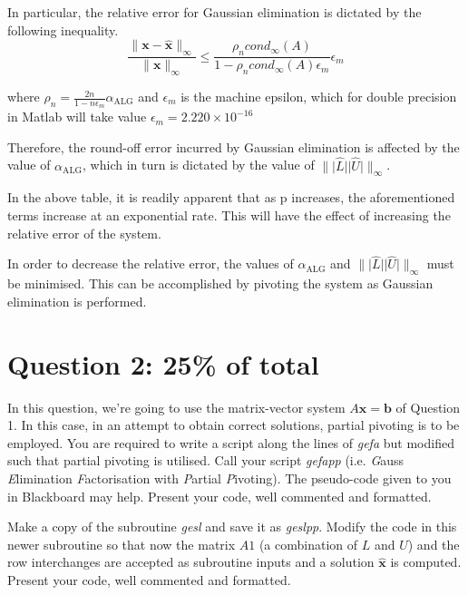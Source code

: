 \documentclass[12pt]{article}
\def\MM#1{\boldsymbol{#1}}
\begin{document}
In particular, the relative error for Gaussian elimination is dictated by the following inequality.
\begin{equation}
\label{eq:relative}
	\frac{\|{\MM{x}-\hat{\MM{x}}}\|_\infty}{\|{\MM{x}}\|_\infty} \leq \frac{\rho_n cond_{\infty}(A) }{1-\rho_n cond_{\infty}(A) \epsilon_m}\epsilon_m
\end{equation}

where $\rho_n = \frac{2n}{1-n\epsilon_m}\alpha_{\mathrm{ALG}}$ and $\epsilon_m$ is the machine epsilon, which for double precision in Matlab will take value $\epsilon_m = 2.220 \times 10^{-16}$

Therefore, the round-off error incurred by Gaussian elimination is affected by the value of $\displaystyle{\alpha_{\mathrm{ALG}}}$, which in turn is dictated by the value of $\displaystyle{\|\lvert \hat{L} \rvert \lvert \hat{U} \rvert} \|_\infty$. 

In the above table, it is readily apparent that as p increases, the aforementioned terms increase at an exponential rate. This will have the effect of increasing the relative error of the system.

In order to decrease the relative error, the values of $\displaystyle{\alpha_{\mathrm{ALG}}}$ and $\displaystyle{\|\lvert \hat{L} \rvert \lvert \hat{U} \rvert} \|_\infty$ must be minimised. This can be accomplished by pivoting the system as Gaussian elimination is performed.

\newpage
\section*{Question 2: 25\% of total}
In this question, we're going to use the matrix-vector system $A\MM{x}=\MM{b}$ of Question 1. In this case, in an attempt to obtain correct solutions, partial pivoting is to be employed. You are required to write a script along the lines of \emph{gefa} but modified such that partial pivoting is utilised. Call your script \emph{gefapp} (i.e. \emph{G}auss \emph{E}limination \emph{F}actorisation with \emph{P}artial \emph{P}ivoting). The pseudo-code given to you in Blackboard may help. Present your code, well commented and formatted.

Make a copy of the subroutine \emph{gesl} and save it as \emph{geslpp}. Modify the code in this newer subroutine so that now the matrix $A1$ (a combination of $L$ and $U$) and the row interchanges are accepted as subroutine inputs and a solution $\hat{\MM{x}}$ is computed. Present your code, well commented and formatted.
\end{document}
